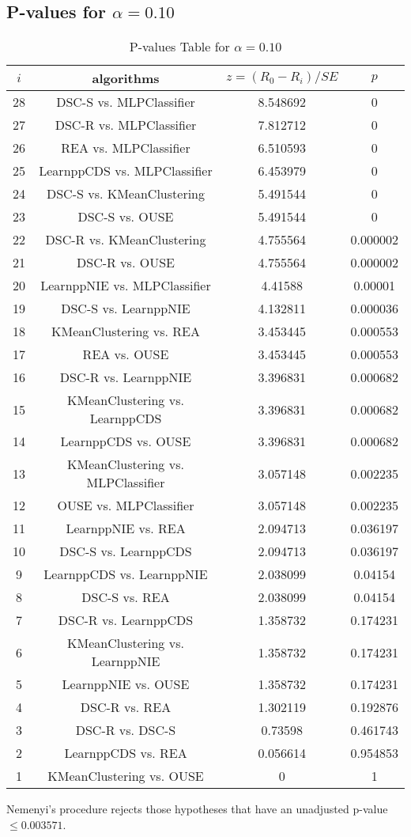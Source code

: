\documentclass[a4paper,10pt]{article}
\begin{document}
\begin{landscape}
\pagebreak

\subsection{P-values for $\alpha=0.10$}

\begin{table}[!htp]
\centering\scriptsize
\begin{tabular}{cccc}
$i$&algorithms&$z=(R_0 - R_i)/SE$&$p$\\
\hline28&DSC-S vs. MLPClassifier&8.548692&0\\
27&DSC-R vs. MLPClassifier&7.812712&0\\
26&REA vs. MLPClassifier&6.510593&0\\
25&LearnppCDS vs. MLPClassifier&6.453979&0\\
24&DSC-S vs. KMeanClustering&5.491544&0\\
23&DSC-S vs. OUSE&5.491544&0\\
22&DSC-R vs. KMeanClustering&4.755564&0.000002\\
21&DSC-R vs. OUSE&4.755564&0.000002\\
20&LearnppNIE vs. MLPClassifier&4.41588&0.00001\\
19&DSC-S vs. LearnppNIE&4.132811&0.000036\\
18&KMeanClustering vs. REA&3.453445&0.000553\\
17&REA vs. OUSE&3.453445&0.000553\\
16&DSC-R vs. LearnppNIE&3.396831&0.000682\\
15&KMeanClustering vs. LearnppCDS&3.396831&0.000682\\
14&LearnppCDS vs. OUSE&3.396831&0.000682\\
13&KMeanClustering vs. MLPClassifier&3.057148&0.002235\\
12&OUSE vs. MLPClassifier&3.057148&0.002235\\
11&LearnppNIE vs. REA&2.094713&0.036197\\
10&DSC-S vs. LearnppCDS&2.094713&0.036197\\
9&LearnppCDS vs. LearnppNIE&2.038099&0.04154\\
8&DSC-S vs. REA&2.038099&0.04154\\
7&DSC-R vs. LearnppCDS&1.358732&0.174231\\
6&KMeanClustering vs. LearnppNIE&1.358732&0.174231\\
5&LearnppNIE vs. OUSE&1.358732&0.174231\\
4&DSC-R vs. REA&1.302119&0.192876\\
3&DSC-R vs. DSC-S&0.73598&0.461743\\
2&LearnppCDS vs. REA&0.056614&0.954853\\
1&KMeanClustering vs. OUSE&0&1\\
\hline
\end{tabular}
\caption{P-values Table for $\alpha=0.10$}
\end{table}Nemenyi's procedure rejects those hypotheses that have an unadjusted p-value $\le0.003571$.


\end{landscape}
\end{document}
